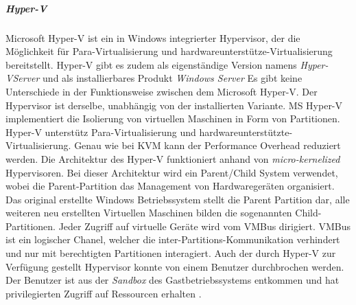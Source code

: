 \subparagraph{Hyper-V}
Microsoft Hyper-V ist ein in Windows integrierter Hypervisor, der die Möglichkeit für Para-Virtualisierung und hardwareunterstütze-Virtualisierung bereitstellt. Hyper-V gibt es zudem als eigenständige Version namens \emph{Hyper-VServer} und als installierbares Produkt \emph{Windows Server} Es gibt keine Unterschiede in der Funktionsweise zwischen dem Microsoft Hyper-V. Der Hypervisor ist derselbe, unabhängig von der installierten Variante. MS Hyper-V implementiert die Isolierung von virtuellen Maschinen in Form von Partitionen. Hyper-V unterstütz Para-Virtualisierung und hardwareunterstützte-Virtualisierung. Genau wie bei KVM kann der Performance Overhead reduziert werden. Die Architektur des Hyper-V funktioniert anhand von \emph{micro-kernelized} Hypervisoren. Bei dieser Architektur wird ein Parent/Child System verwendet, wobei die Parent-Partition das Management von Hardwaregeräten organisiert. Das original erstellte Windows Betriebssystem stellt die Parent Partition dar, alle weiteren neu erstellten Virtuellen Maschinen bilden die sogenannten Child-Partitionen. Jeder Zugriff auf virtuelle Geräte wird vom VMBus dirigiert. VMBus ist ein logischer Chanel, welcher die inter-Partitions-Kommunikation verhindert und nur mit berechtigten Partitionen interagiert. Auch der durch Hyper-V zur Verfügung gestellt Hypervisor konnte von einem Benutzer durchbrochen werden. Der Benutzer ist aus der \emph{Sandbox} des Gastbetriebssystems entkommen und hat privilegierten Zugriff auf Ressourcen erhalten \cite{Fayyad-Kazan2013BenchmarkingHypervisors}.
